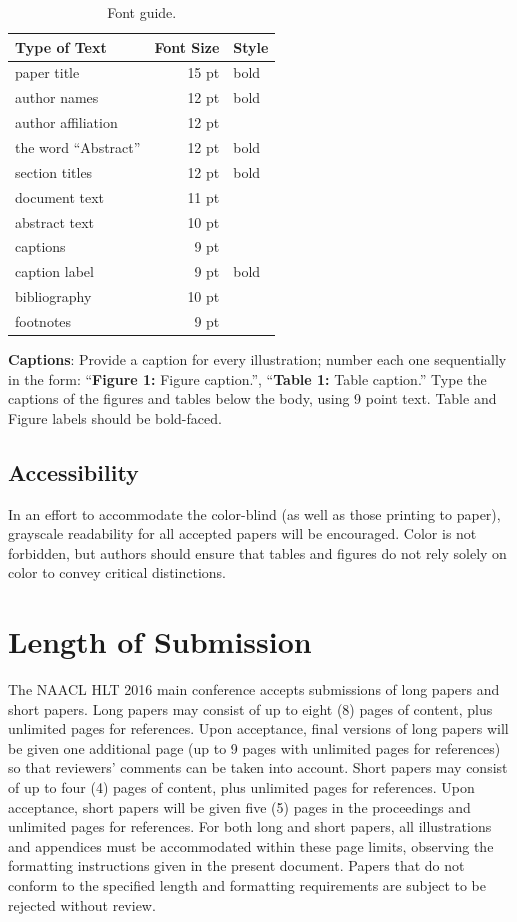 \documentclass{article}
\begin{document}
\begin{table}
\small
\centering
\begin{tabular}{|l|rl|}
\hline \bf Type of Text & \bf Font Size & \bf Style \\ \hline
paper title & 15 pt & bold \\
author names & 12 pt & bold \\
author affiliation & 12 pt & \\
the word ``Abstract'' & 12 pt & bold \\
section titles & 12 pt & bold \\
document text & 11 pt  &\\
abstract text & 10 pt & \\
captions & 9 pt & \\
caption label & 9 pt & bold \\
bibliography & 10 pt & \\
footnotes & 9 pt & \\
\hline
\end{tabular}
\caption{\label{font-table} Font guide.}
\end{table}

{\bf Captions}: Provide a caption for every illustration; number each one
sequentially in the form:  ``{\bf Figure 1:} Figure caption.'', ``{\bf Table 1:} Table caption.''  Type the captions of the figures and 
tables below the body, using 9 point text.  Table and Figure labels should be bold-faced.

\subsection{Accessibility}
\label{ssec:accessibility}

In an effort to accommodate the color-blind (as well as those printing
to paper), grayscale readability for all accepted papers will be
encouraged.  Color is not forbidden, but authors should ensure that
tables and figures do not rely solely on color to convey critical
distinctions.

\section{Length of Submission}
\label{sec:length}

The NAACL HLT 2016 main conference accepts submissions of long papers and short papers.  Long papers may consist of up to eight (8) pages of content, plus unlimited pages for references. Upon acceptance, final versions of long papers will be given one additional page (up to 9 pages with unlimited pages for references) so that reviewers' comments can be taken into account.  Short papers may consist of up to four (4) pages of content, plus unlimited pages for references. Upon acceptance, short papers will be given five (5) pages in the proceedings and unlimited pages for references.  For both long and short papers, all illustrations and appendices must be accommodated within these page limits, observing the formatting instructions given in the present document.  Papers that do not conform to the specified length and formatting requirements are subject to be rejected without review.
\end{document}
